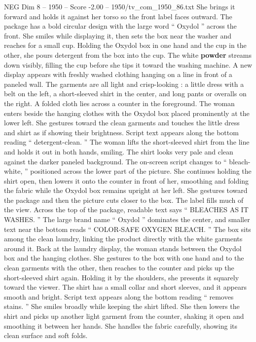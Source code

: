\begin{textsample}{NEG Dim 8 – 1950 – Score -2.00 – 1950/tv\_com\_1950\_86.txt}
She brings it forward and holds it against her torso so the front label faces outward.
The package has a bold circular design with the large word “ Oxydol ” across the front.
She smiles while displaying it, then sets the box near the washer and reaches for a small cup.
Holding the Oxydol box in one hand and the cup in the other, she pours detergent from the box into the cup.
The white \textbf{powder} streams down visibly, filling the cup before she tips it toward the washing machine.
A new display appears with freshly washed clothing hanging on a line in front of a paneled wall.
The garments are all light and crisp-looking : a little dress with a belt on the left, a short-sleeved shirt in the center, and long pants or overalls on the right.
A folded cloth lies across a counter in the foreground.
The woman enters beside the hanging clothes with the Oxydol box placed prominently at the lower left.
She gestures toward the clean garments and touches the little dress and shirt as if showing their brightness.
Script text appears along the bottom reading “ detergent-clean. ” The woman lifts the short-sleeved shirt from the line and holds it out in both hands, smiling.
The shirt looks very pale and clean against the darker paneled background.
The on-screen script changes to “ bleach-white, ” positioned across the lower part of the picture.
She continues holding the shirt open, then lowers it onto the counter in front of her, smoothing and folding the fabric while the Oxydol box remains upright at her left.
She gestures toward the package and then the picture cuts closer to the box.
The label fills much of the view.
Across the top of the package, readable text says “ BLEACHES AS IT WASHES. ” The large brand name “ Oxydol ” dominates the center, and smaller text near the bottom reads “ COLOR-SAFE OXYGEN BLEACH. ” The box sits among the clean laundry, linking the product directly with the white garments around it.
Back at the laundry display, the woman stands between the Oxydol box and the hanging clothes.
She gestures to the box with one hand and to the clean garments with the other, then reaches to the counter and picks up the short-sleeved shirt again.
Holding it by the shoulders, she presents it squarely toward the viewer.
The shirt has a small collar and short sleeves, and it appears smooth and bright.
Script text appears along the bottom reading “ removes stains. ” She smiles broadly while keeping the shirt lifted.
She then lowers the shirt and picks up another light garment from the counter, shaking it open and smoothing it between her hands.
She handles the fabric carefully, showing its clean surface and soft folds.

\end{textsample}
